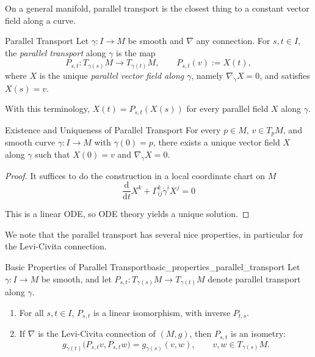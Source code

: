 On a general manifold, parallel transport is the closest thing to a constant vector field along a curve.

\begin{colordef}{Parallel Transport}{}
Let $\gamma: I \to M$ be smooth and $\nabla$ any connection. For $s, t \in I$, the \emph{parallel transport} along $\gamma$ is the map
\[
P_{s,t} \colon T_{\gamma(s)}M \longrightarrow T_{\gamma(t)}M, \qquad P_{s,t}(v) := X(t),
\]
where $X$ is the unique \emph{parallel vector field along} $\gamma$, namely $\nabla_{\dot\gamma} X = 0$, and satisfies $X(s) = v$.
\end{colordef}

With this terminology, $X(t) = P_{s,t}(X(s))$ for every parallel field $X$ along $\gamma$.

\begin{colortheo}{Existence and Uniqueness of Parallel Transport}{}
For every $p \in M$, $v \in T_pM$, and smooth curve $\gamma: I \to M$ with $\gamma(0) = p$, there exists a unique vector field $X$ along $\gamma$ such that $X(0) = v$ and $\nabla_{\dot{\gamma}} X = 0$.

\end{colortheo}

\begin{proof}
It suffices to do the construction in a local coordinate chart on $M$
\[
\frac{\mathrm{d}}{\mathrm{d}t} X^k + \Gamma_{ij}^k \dot{\gamma}^i X^j = 0
\]

This is a linear ODE, so ODE theory yields a unique solution.
\end{proof}

We note that the parallel transport has several nice properties, in particular for the Levi-Civita connection.
\begin{colorlem}{Basic Properties of Parallel Transport}{basic_properties_parallel_transport}
Let $\gamma:I\to M$ be smooth, and let $P_{s,t}:T_{\gamma(s)}M\longrightarrow T_{\gamma(t)}M$ denote parallel transport along $\gamma$.

\begin{enumerate}
    \item For all $s,t\in I$, $P_{s,t}$ is a linear isomorphism, with inverse $P_{t,s}$.
    \item If $\nabla$ is the Levi-Civita connection of $(M,g)$, then $P_{s,t}$ is an isometry:
    \[
    g_{\gamma(t)}\!\big(P_{s,t}v,P_{s,t}w\big)=g_{\gamma(s)}(v,w),
    \qquad v,w\in T_{\gamma(s)}M.
    \]
\end{enumerate}
\end{colorlem}

